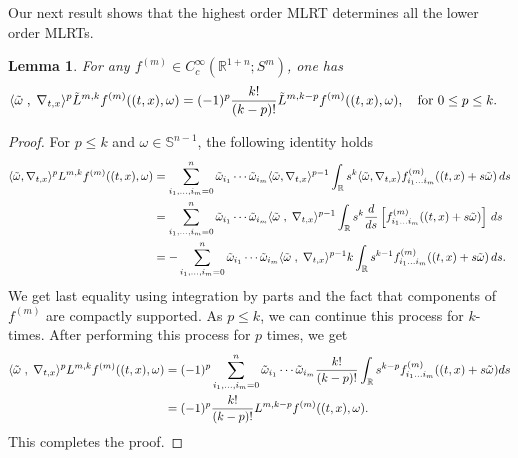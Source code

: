 \documentclass[11pt,a4paper,reqno]{amsart}
\newcommand{\qum}[1]{\quad\mbox{#1}}
\newtheorem{lemma}[definition]{Lemma}
\newcommand{\om}{\omega}
\newcommand{\sn}{\mathbb{S}^{n-1}}
\begin{document}
	Our next result shows that the highest order MLRT determines all the lower order MLRTs.
	\begin{lemma}\label{lem:lower_mlrt_detremination}
For any $f^{(m)}  \in C_{c}^{\infty}(\mathbb{R}^{1+n};S^m)$, one has 
\begin{align*}
	\langle \Tilde{\omega} \; , \; \nabla_{t,x} \rangle ^{p}\tilde{L}^{m,k}f^{(m)}((t,x),\om) &=(-1)^p\frac{k!}{(k-p)!}\tilde{L}^{m,k-p}f^{(m)}((t,x),\om), \qum{for $0\le p\le k$}.
\end{align*}
	\end{lemma}
			\begin{proof}
			For $p\leq k$ and $\om \in \sn$, the following identity holds
			\begin{equation*}
				\begin{aligned}
					\langle \Tilde{\omega} , \nabla_{t,x} \rangle ^{p}L^{m,k}f^{(m)}((t,x),\om )&=\sum_{i_1,\dots,i_m=0}^{n}\tilde{\omega}_{i_1}\cdots \tilde{\omega}_{i_m}\langle \Tilde{\omega}  , \nabla_{t,x} \rangle ^{p-1}\int_{\mathbb{R}}s^k\langle \tilde{\omega},\nabla_{t,x} \rangle f_{i_1\dots i_m}^{(m)}((t,x)+s\Tilde{\omega})\,ds\\
					&=\sum_{i_1,\dots,i_m=0}^{n}\tilde{\omega}_{i_1}\cdots \tilde{\omega}_{i_m}\langle \Tilde{\omega} \; , \; \nabla_{t,x} \rangle ^{p-1}\int_{\mathbb{R}}s^k \frac{d}{ds}\left[f_{i_1\dots i_m}^{(m)}((t,x)+s\Tilde{\omega})\right]\, ds\\
					&=-\sum_{i_1,\dots,i_m=0}^{n}\tilde{\omega}_{i_1}\cdots \tilde{\omega}_{i_m}\langle \Tilde{\omega} \; , \; \nabla_{t,x} \rangle ^{p-1}k\int_{\mathbb{R}}s^{k-1}f_{i_1\dots i_m}^{(m)}((t,x)+s\Tilde{\omega})\,ds.\\
				\end{aligned}
			\end{equation*}
			We get last equality using integration by parts and the fact that components of $f^{(m)}$ are compactly supported. As $p\leq k$, we can continue this process for $k$-times. After performing this process for $p$ times, we get
			\begin{equation*}
				\begin{aligned}
					\langle \Tilde{\omega} \; , \; \nabla_{t,x} \rangle ^{p}L^{m,k}f^{(m)}((t,x),\om)&=(-1)^p \sum_{i_1,\dots,i_m=0}^{n}\tilde{\omega}_{i_1}\cdots \tilde{\omega}_{i_m}\frac{k!}{(k-p)!}\int_{\mathbb{R}}s^{k-p}f_{i_1\dots i_m}^{(m)}((t,x)+s\Tilde{\omega})ds\\
					&=(-1)^p\frac{k!}{(k-p)!}L^{m,k-p}f^{(m)}((t,x),\om).
				\end{aligned}
			\end{equation*}
		This completes the proof.
		\end{proof}
\end{document}
